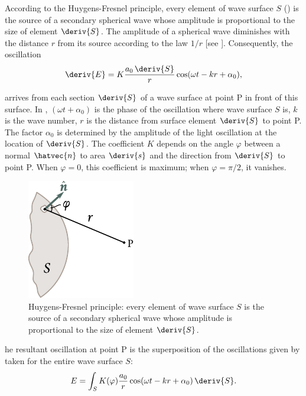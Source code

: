 According to the Huygens-Fresnel principle, every element of wave surface $S$ () is the source of a secondary spherical wave whose amplitude is proportional to the size of element $\deriv{S}$.
The amplitude of a spherical wave diminishes with the distance $r$ from its source according to the law $1/r$ [see ].
Consequently, the oscillation
\begin{equation}\label{eq:18_1}
    \deriv{E} = K \frac{a_0\, \deriv{S}}{r} \cos(\omega t - kr + \alpha_0),
\end{equation}

\noindent
arrives from each section $\deriv{S}$ of a wave surface at point P in front of this surface.
In , $(\omega t+\alpha_0)$ is the phase of the oscillation where wave surface $S$ is, $k$ is the wave number, $r$ is the distance from surface element $\deriv{S}$ to point P.
The factor $\alpha_0$ is determined by the amplitude of the light oscillation at the location of $\deriv{S}$.
The coefficient $K$ depends on the angle $\varphi$ between a normal $\hatvec{n}$ to area $\deriv{s}$ and the direction from $\deriv{S}$ to point P.
When $\varphi=0$, this coefficient is maximum; when $\varphi=\pi/2$, it vanishes.

\begin{figure}[t]
	\begin{center}
		\includegraphics[scale=1]{figures/ch_18/fig_18_2.pdf}
        \caption[]{Huygens-Fresnel principle: every element of wave surface $S$ is the source of a secondary spherical wave whose amplitude is proportional to the size of element $\deriv{S}$.}
		\label{fig:18_2}
	\end{center}
	\vspace{-0.8cm}
\end{figure}

he resultant oscillation at point P is the superposition of the oscillations given by  taken for the entire wave surface $S$:
\begin{equation}\label{eq:18_2}
    E = \int_S K(\varphi) \frac{a_0}{r} \cos(\omega t - kr + \alpha_0)\, \deriv{S}.
\end{equation}

